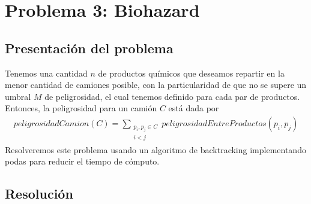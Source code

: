 \section{Problema 3: Biohazard}

\subsection{Presentaci\'on del problema}
Tenemos una cantidad $n$ de productos químicos que deseamos repartir en la menor cantidad de camiones posible, con la particularidad de que no se supere un umbral $M$ de peligrosidad, el cual tenemos definido para cada par de productos. Entonces, la peligrosidad para un camión $C$ está dada por
\begin{align*}
peligrosidadCamion(C) = \sum\limits_{\substack{p_i,p_j \in C \\ i < j}} peligrosidadEntreProductos(p_i,p_j)
\end{align*}
Resolveremos este problema usando un algoritmo de backtracking implementando podas para reducir el tiempo de cómputo.

\subsection{Resoluci\'on}
